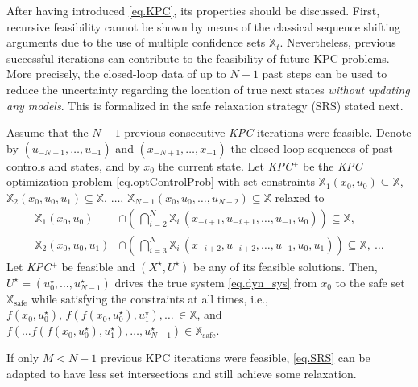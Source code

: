 After having introduced \eqref{eq.KPC}, its properties should be discussed. First, recursive feasibility cannot be shown by means of the classical sequence shifting arguments due to the use of multiple confidence sets $\mathbb{X}_t$. Nevertheless, previous successful iterations can contribute to the feasibility of future KPC problems. More precisely, the closed-loop data of up to $N-1$ past steps can be used to reduce the uncertainty regarding the location of true next states \textit{without updating any models}. This is formalized in the safe relaxation strategy (SRS) stated next.

\begin{proposition}
	Assume that the $N-1$ previous consecutive \emph{KPC} iterations were feasible. Denote by $(u_{-N+1}, \dots, u_{-1})$ and $(x_{-N+1}, \dots, x_{-1})$ the closed-loop sequences of past controls and states, and by $x_0$ the current state. Let \emph{KPC}$^+$ be the \emph{KPC} optimization problem \eqref{eq.optControlProb} with set constraints $\mathbb{X}_1(x_0,u_0) \subseteq \mathbb{X}$, $\mathbb{X}_2(x_0,u_0,u_1) \subseteq \mathbb{X}$, $\dots$, $\mathbb{X}_{N-1}(x_0,u_0,\dots,u_{N-2}) \subseteq \mathbb{X}$ relaxed to
	\begin{equation}
		\label{eq.SRS}
		\begin{aligned}
			\mathbb{X}_1(x_0,u_0) &\cap \left( \, \bigcap_{i = 2}^{N} \mathbb{X}_{i} \, (x_{-i+1},u_{-i+1},\dots,u_{-1},u_0) \right) \subseteq \mathbb{X}, \\
			\mathbb{X}_2(x_0,u_0,u_{1}) &\cap \left( \, \bigcap_{i=3}^N \mathbb{X}_{i} \, (x_{-i+2},u_{-i+2},\dots,u_{-1},u_0,u_1) \right) \subseteq \mathbb{X}, \ \dots
		\end{aligned}
	\end{equation}
	Let \emph{KPC}$^+$ be feasible and $(X^\star,U^\star)$ be any of its feasible solutions. Then, $U^\star = (u_0^\star, \dots, u_{N-1}^\star)$ drives the true system \eqref{eq.dyn_sys} from $x_0$ to the safe set $\mathbb{X}_{\text{safe}}$ while satisfying the constraints at all times, i.e., $f(x_0,u_0^\star), \, f(f(x_0,u_0^\star),u_1^\star), \dots \, \in \mathbb{X}$, and $f(\dots f(f(x_0,u_0^\star),u_1^\star),\dots,u_{N-1}^\star) \in \mathbb{X}_{\text{safe}}$.
	\label{prop.SRS}
\end{proposition}

\begin{remark}
If only $M < N-1$ previous KPC iterations were feasible, \eqref{eq.SRS} can be adapted to have less set intersections and still achieve some relaxation.
\end{remark}

